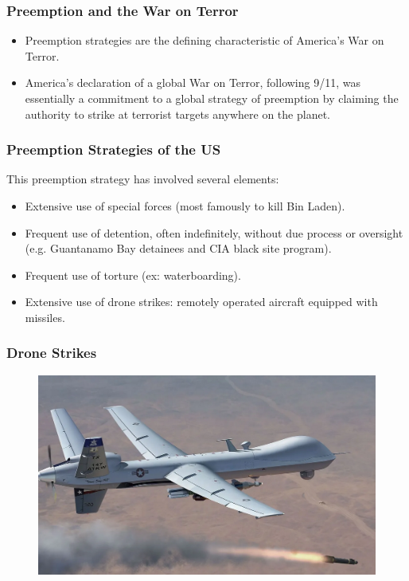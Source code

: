 \documentclass{beamer}
\begin{document}
\begin{frame} 
\frametitle{\LARGE{Preemption and the War on Terror}}
\begin{itemize}
	\item Preemption strategies are the defining characteristic of America's War on Terror. \pause
	\item America's declaration of a global War on Terror, following 9/11, was essentially a commitment to a global strategy of preemption by claiming the authority to strike at terrorist targets anywhere on the planet.	
\end{itemize}
\end{frame}

\begin{frame} 
	\frametitle{\LARGE{Preemption Strategies of the US}}
This preemption strategy has involved several elements:
	\begin{itemize}
		\item Extensive use of special forces (most famously to kill Bin Laden). \pause	
		\item Frequent use of detention, often indefinitely, without due process or oversight (e.g. Guantanamo Bay detainees and CIA black site program). \pause
		\item Frequent use of torture (ex: waterboarding). \pause
		\item Extensive use of drone strikes: remotely operated aircraft equipped with missiles.
	\end{itemize}
\end{frame}

\begin{frame} 
	\frametitle{\LARGE{Drone Strikes}}
	\begin{figure}[ht!]
		\centering
		\includegraphics[width=\textwidth,height=\textheight,keepaspectratio]{drone.png}
	\end{figure}
\end{frame}
\end{document}
